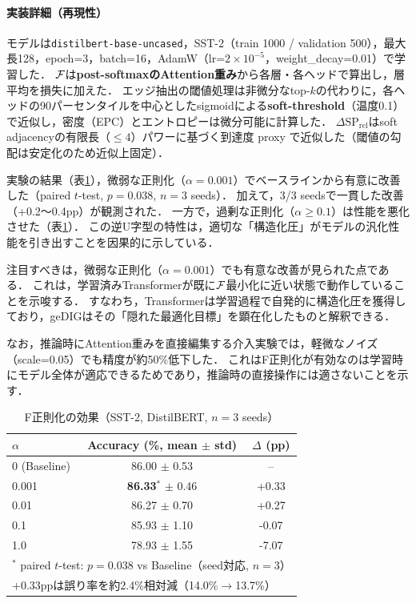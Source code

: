 \paragraph{実装詳細（再現性）}
モデルは\texttt{distilbert-base-uncased}，SST-2（train 1000 / validation 500），最大長128，epoch=3，batch=16，AdamW（lr=$2\times10^{-5}$，weight\_decay=0.01）で学習した．
$\mathcal{F}$は\textbf{post-softmaxのAttention重み}から各層・各ヘッドで算出し，層平均を損失に加えた．
エッジ抽出の閾値処理は非微分なtop-$k$の代わりに，各ヘッドの90パーセンタイルを中心としたsigmoidによる\textbf{soft-threshold}（温度0.1）で近似し，密度（EPC）とエントロピーは微分可能に計算した．
$\Delta\mathrm{SP}_{\mathrm{rel}}$はsoft adjacencyの有限長（$\le4$）パワーに基づく到達度 proxy で近似した（閾値の勾配は安定化のため近似上固定）．

実験の結果（表\ref{tab:f_reg}），微弱な正則化（$\alpha=0.001$）でベースラインから有意に改善した（paired $t$-test, $p=0.038$, $n=3$ seeds）．
加えて，3/3 seedsで一貫した改善（+0.2〜0.4pp）が観測された．
一方で，過剰な正則化（$\alpha \geq 0.1$）は性能を悪化させた（表\ref{tab:f_reg}）．
この逆U字型の特性は，適切な「構造化圧」がモデルの汎化性能を引き出すことを因果的に示している．

注目すべきは，微弱な正則化（$\alpha=0.001$）でも有意な改善が見られた点である．
これは，学習済みTransformerが既に$\mathcal{F}$最小化に近い状態で動作していることを示唆する．
すなわち，Transformerは学習過程で自発的に構造化圧を獲得しており，geDIGはその「隠れた最適化目標」を顕在化したものと解釈できる．

なお，推論時にAttention重みを直接編集する介入実験では，軽微なノイズ（scale=0.05）でも精度が約50\%低下した．
これはF正則化が有効なのは学習時にモデル全体が適応できるためであり，推論時の直接操作には適さないことを示す．

\begin{table}[t]
\centering
\caption{F正則化の効果（SST-2, DistilBERT, $n=3$ seeds）}
\label{tab:f_reg}
\small
\begin{tabular}{lcc}
\toprule
$\alpha$ & Accuracy (\%, mean $\pm$ std) & $\Delta$ (pp) \\
\midrule
0 (Baseline) & 86.00 $\pm$ 0.53 & -- \\
0.001 & \textbf{86.33}$^*$ $\pm$ 0.46 & +0.33 \\
0.01 & 86.27 $\pm$ 0.70 & +0.27 \\
0.1 & 85.93 $\pm$ 1.10 & -0.07 \\
1.0 & 78.93 $\pm$ 1.55 & -7.07 \\
\bottomrule
\multicolumn{3}{l}{\scriptsize $^*$ paired $t$-test: $p=0.038$ vs Baseline（seed対応, $n=3$）} \\
\multicolumn{3}{l}{\scriptsize +0.33ppは誤り率を約2.4\%相対減（14.0\%$\to$13.7\%）} \\
\end{tabular}
\end{table}

